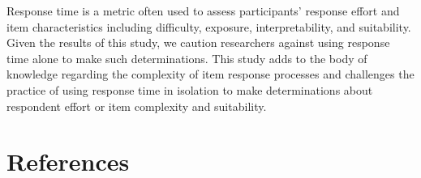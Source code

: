 \documentclass[
]{agujournal2019}
\begin{document}
Response time is a metric often used to assess participants' response
effort and item characteristics including difficulty, exposure,
interpretability, and suitability. Given the results of this study, we
caution researchers against using response time alone to make such
determinations. This study adds to the body of knowledge regarding the
complexity of item response processes and challenges the practice of
using response time in isolation to make determinations about respondent
effort or item complexity and suitability.

\section*{References}\label{references}

\label{refs}
\end{document}

